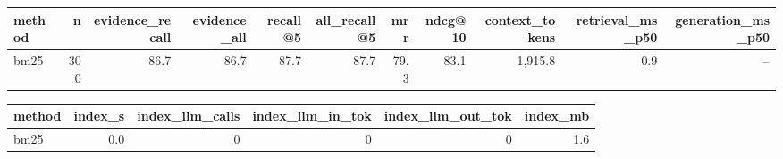 \begin{tabular}{lrrrrrrrrrr}
\toprule
method & n & evidence\_recall & evidence\_all & recall@5 & all\_recall@5 & mrr & ndcg@10 & context\_tokens & retrieval\_ms\_p50 & generation\_ms\_p50 \\
\midrule
bm25 & 300 & 86.7 & 86.7 & 87.7 & 87.7 & 79.3 & 83.1 & 1,915.8 & 0.9 & -- \\
\bottomrule
\end{tabular}

\begin{tabular}{lrrrrr}
\toprule
method & index\_s & index\_llm\_calls & index\_llm\_in\_tok & index\_llm\_out\_tok & index\_mb \\
\midrule
bm25 & 0.0 & 0 & 0 & 0 & 1.6 \\
\bottomrule
\end{tabular}
